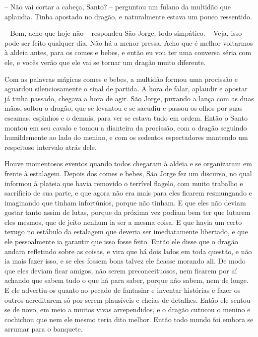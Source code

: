 -- Não vai cortar a cabeça, Santo? -- perguntou um fulano da multidão
que aplaudia. Tinha apostado no dragão, e naturalmente estava um
pouco ressentido.

-- Bom, acho que hoje não -- respondeu São Jorge, todo simpático. --
Veja, isso pode ser feito qualquer dia. Não há a menor pressa. Acho
que é melhor voltarmos à aldeia antes, para os comes e bebes, e então
eu vou ter uma conversa séria com ele, e vocês verão que ele vai se
tornar um dragão muito diferente.

Com as palavras mágicas comes e bebes, a multidão formou uma procissão
e aguardou silenciosamente o sinal de partida. A hora de falar,
aplaudir e apostar já tinha passado, chegava a hora de agir. São
Jorge, puxando a lança com as duas mãos, soltou o dragão, que se
levantou e se sacudiu e passou os olhos por suas escamas, espinhos e
o demais, para ver se estava tudo em ordem. Então o Santo montou em
seu cavalo e tomou a dianteira da procissão, com o dragão seguindo
humildemente ao lado do menino, e com os sedentos espectadores
mantendo um respeitoso intervalo atrás dele.

Houve momentosos eventos quando todos chegaram à aldeia e se
organizaram em frente à estalagem. Depois dos comes e bebes, São
Jorge fez um discurso, no qual informou à plateia que havia removido
o terrível flagelo, com muito trabalho e sacrifício de sua parte, e
que agora não era mais para eles ficarem resmungando e imaginando que
tinham infortúnios, porque não tinham. E que eles não deviam gostar
tanto assim de lutas, porque da próxima vez podiam bem ter que
lutarem eles mesmos, que de jeito nenhum ia ser a mesma coisa. E que
havia um certo texugo no estábulo da estalagem que deveria ser
imediatamente libertado, e que ele pessoalmente ia garantir que isso
fosse feito. Então ele disse que o dragão andara refletindo sobre as
coisas, e vira que há dois lados em toda questão, e não ia mais fazer
isso, e se eles fossem bons talvez ele ficasse morando ali. De modo
que eles deviam ficar amigos, não serem preconceituosos, nem ficarem
por aí achando que sabem tudo o que há para saber, porque não sabem,
nem de longe. E ele advertiu-os quanto ao pecado de fantasiar e
inventar histórias e fazer os outros acreditarem só por serem
plausíveis e cheias de detalhes. Então ele sentou-se de novo, em meio
a muitos vivas arrependidos, e o dragão cutucou o menino e cochichou
que nem ele mesmo teria dito melhor. Então todo mundo foi embora se
arrumar para o banquete.

